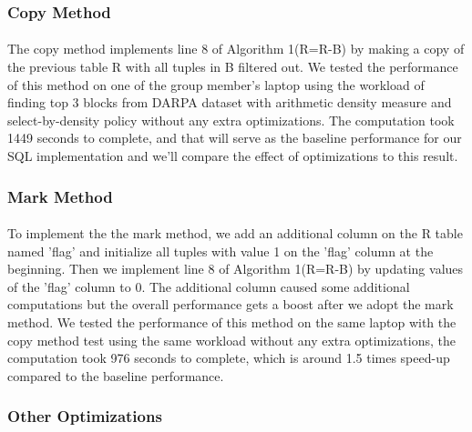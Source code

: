 \subsubsection{Copy Method}
\paragraph{} The copy method implements line 8 of Algorithm 1(R=R-B) by making a copy of the previous table R with all tuples in B filtered out. We tested the performance of this method on one of the group member's laptop
using the workload of finding top 3 blocks from DARPA dataset with arithmetic density measure and select-by-density policy without any extra optimizations.
The computation took 1449 seconds to complete, and that will serve as the baseline performance for our SQL implementation and we'll compare the effect of optimizations to
this result.
\subsubsection{Mark Method}
\paragraph{} To implement the the mark method, we add an additional column on the R table named 'flag' and initialize all tuples with value 1 on the 'flag' column at the beginning. Then we implement line 8 of Algorithm 1(R=R-B) by
updating values of the 'flag' column to 0. The additional column caused some additional computations but the overall performance gets a boost after we adopt the mark method.
We tested the performance of this method on the same laptop with the copy method test using the same workload without any extra optimizations, the computation took 976 seconds to complete,
which is around 1.5 times speed-up compared to the baseline performance.
\subsubsection{Other Optimizations}
